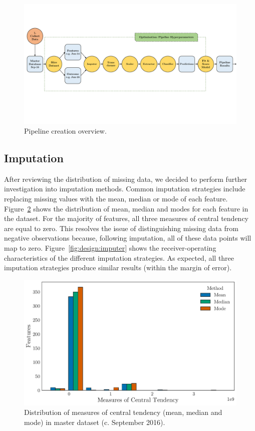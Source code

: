 \documentclass[../thesis/thesis.tex]{subfiles}
\begin{document}
\begin{figure}[!htb]
    \centering
    \includegraphics[width=\textwidth]{../figures/design/pipeline_creation}
    \caption[Pipeline creation flowchart]{Pipeline creation overview.}
    \label{fig:design:pipeline_creation}
\end{figure}

\subsection{Imputation}

After reviewing the distribution of missing data, we decided to perform further investigation into imputation methods. Common imputation strategies include replacing missing values with the mean, median or mode of each feature. Figure~\ref{fig:design:central_tendency} shows the distribution of mean, median and modes for each feature in the dataset. For the majority of features, all three measures of central tendency are equal to zero. This resolves the issue of distinguishing missing data from negative observations because, following imputation, all of these data points will map to zero. Figure~\ref{fig:design:imputer} shows the receiver-operating characteristics of the different imputation strategies. As expected, all three imputation strategies produce similar results (within the margin of error).

\begin{figure}[!htb]
    \centering
    \includegraphics[width=\textwidth]{../figures/design/central_tendency}
    \caption[Imputation replacement values]{Distribution of measures of central tendency (mean, median and mode) in master dataset (c. September 2016).}
    \label{fig:design:central_tendency}
\end{figure}
\end{document}

